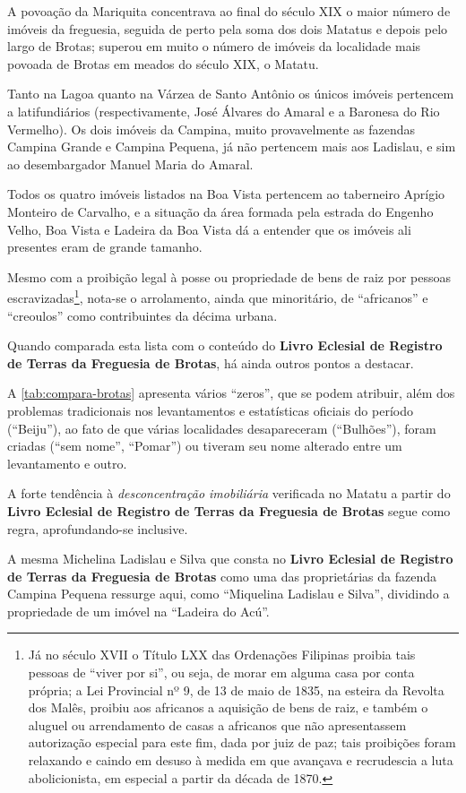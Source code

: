 

A povoação da Mariquita concentrava ao final do século XIX o maior número de imóveis da freguesia, seguida de perto pela soma dos dois Matatus e depois pelo largo de Brotas; superou em muito o número de imóveis da localidade mais povoada de Brotas em meados do século XIX, o Matatu.

Tanto na Lagoa quanto na Várzea de Santo Antônio os únicos imóveis pertencem a latifundiários (respectivamente, José Álvares do Amaral e a Baronesa do Rio Vermelho). Os dois imóveis da Campina, muito provavelmente as fazendas Campina Grande e Campina Pequena, já não pertencem mais aos Ladislau, e sim ao desembargador Manuel Maria do Amaral.

Todos os quatro imóveis listados na Boa Vista pertencem ao taberneiro Aprígio Monteiro de Carvalho, e a situação da área formada pela estrada do Engenho Velho, Boa Vista e Ladeira da Boa Vista dá a entender que os imóveis ali presentes eram de grande tamanho.

Mesmo com a proibição legal à posse ou propriedade de bens de raiz por pessoas escravizadas\footnote{Já no século XVII o Título LXX das Ordenações Filipinas proibia tais pessoas de ``viver por si'', ou seja, de morar em alguma casa por conta própria; a Lei Provincial nº 9, de 13 de maio de 1835, na esteira da Revolta dos Malês, proibiu aos africanos a aquisição de bens de raiz, e também o aluguel ou arrendamento de casas a africanos que não apresentassem autorização especial para este fim, dada por juiz de paz; tais proibições foram relaxando e caindo em desuso à medida em que avançava e recrudescia a luta abolicionista, em especial a partir da década de 1870.}, nota-se o arrolamento, ainda que minoritário, de ``africanos'' e ``creoulos'' como contribuintes da décima urbana.

Quando comparada esta lista com o conteúdo do \textbf{Livro Eclesial de Registro de Terras da Freguesia de Brotas}, há ainda outros pontos a destacar.



A \autoref{tab:compara-brotas} apresenta vários ``zeros'', que se podem atribuir, além dos problemas tradicionais nos levantamentos e estatísticas oficiais do período (``Beiju''), ao fato de que várias localidades desapareceram (``Bulhões''), foram criadas (``sem nome'', ``Pomar'') ou tiveram seu nome alterado entre um levantamento e outro.

A forte tendência à \textit{desconcentração imobiliária} verificada no Matatu a partir do \textbf{Livro Eclesial de Registro de Terras da Freguesia de Brotas} segue como regra, aprofundando-se inclusive. 

A mesma Michelina Ladislau e Silva que consta no \textbf{Livro Eclesial de Registro de Terras da Freguesia de Brotas} como uma das proprietárias da fazenda Campina Pequena ressurge aqui, como ``Miquelina Ladislau e Silva'', dividindo a propriedade de um imóvel na ``Ladeira do Acú''.